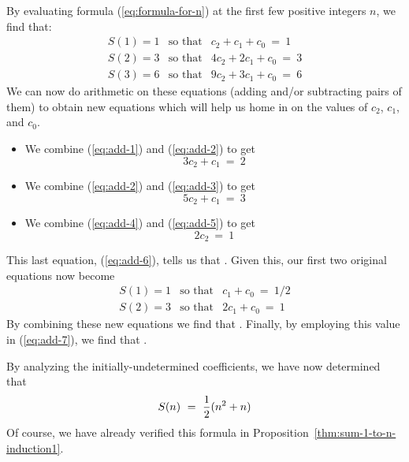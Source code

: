 \noindent By evaluating formula (\ref{eq:formula-for-n}) at the first few positive integers $n$, we find that:
\begin{eqnarray}
\label{eq:add-1}
S(1) = 1
 & \mbox{so that} &
 c_2 + c_1 + c_0 \ = \ 1 \\
\label{eq:add-2}
S(2) = 3
 & \mbox{so that} &
 4 c_2 + 2 c_1 + c_0 \ = \ 3 \\
\label{eq:add-3}
S(3) = 6
 & \mbox{so that} &
 9 c_2 + 3 c_1 + c_0 \ = \ 6
\end{eqnarray}
We can now do arithmetic on these equations (adding and/or subtracting pairs of them) to obtain new equations which will help us home in on the values of $c_2$, $c_1$, and $c_0$.
\begin{itemize}
\item
We combine (\ref{eq:add-1}) and (\ref{eq:add-2}) to get
\begin{equation}
\label{eq:add-4}
3c_2 + c_1 \ = \ 2
\end{equation}

\item
We combine (\ref{eq:add-2}) and (\ref{eq:add-3}) to get
\begin{equation}
\label{eq:add-5}
5 c_2 + c_1 \ = \ 3
\end{equation}

\item
We combine (\ref{eq:add-4}) and (\ref{eq:add-5}) to get
\begin{equation}
\label{eq:add-6}
2 c_2 \ = \ 1
\end{equation}
\end{itemize}
This last equation, (\ref{eq:add-6}), tells us that .  Given this, our first two original equations now become
\begin{eqnarray}
\label{eq:add-7}
S(1) = 1
 & \mbox{so that} &
c_1 + c_0 \ = \ 1/2 \\
\label{eq:add-8}
S(2) = 3
 & \mbox{so that} &
2 c_1 + c_0 \ = \ 1
\end{eqnarray}
By combining these new equations we find that .  Finally, by employing this value in (\ref{eq:add-7}), we find that .

\medskip

\noindent
By analyzing the initially-undetermined coefficients, we have now determined that
\[ S(n) \ = \ {1 \over 2}(n^2 + n) \]
Of course, we have already verified this formula in Proposition~\ref{thm:sum-1-to-n-induction1}.


